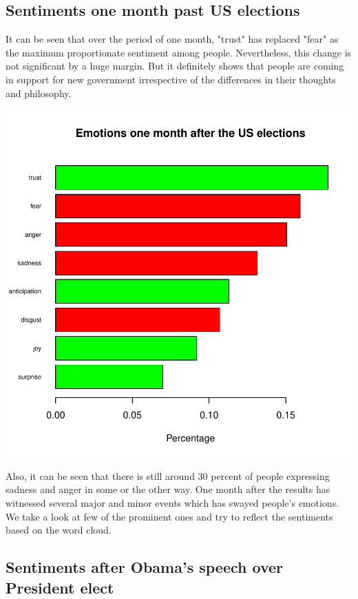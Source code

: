 \documentclass[a4paper,12pt]{book}
\theoremstyle{break}
\begin{document}
\subsection{Sentiments one month past US elections}
It can be seen that over the period of one month, "trust" has replaced "fear" as the maximum proportionate sentiment among people. Nevertheless, this change is not significant by a huge margin. But it definitely shows that people are coming in support for new government irrespective of the differences in their thoughts and philosophy. 



\includegraphics{finnn-r6}


Also, it can be seen that there is still around 30 percent of people expressing sadness and anger in some or the other way. One month after the results has witnessed several major and minor events which has swayed people's emotions. We take a look at few of the prominent ones and try to reflect the sentiments based on the word cloud.

\subsection{Sentiments after Obama's speech over President elect}
\end{document}
